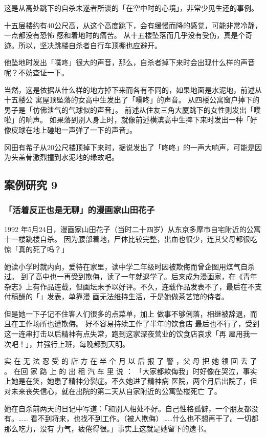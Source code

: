 \documentclass[UTF8]{ctexart}
\begin{document}
这是从高处跳下的自杀未遂者所谈的「在空中时的心境」，非常少见生还的事例。

十五层楼约有$40$公尺高，从这个高度跳下，会有缓慢而降的感觉，可能非常冷静，一点都没有恐怖
感和着地时的痛苦。
从十五楼坠落而几乎没有受伤，真是个奇迹。所以，坚决跳楼自杀者自行车顶棚也应避开。

他坠地时发出「噗咚」很大的声音，那么，自杀者掉下来时会出现什么样的声音呢？不妨查证一下。

当然，这是依据从什么样的地方掉下来而各有不同的，如果地面是水泥地，前述从十五楼公
寓屋顶坠落的女高中生发出了「噗咚」的声音。
从四楼公寓窗户掉下的男子是「仿佛泄气的气球似的声音」。
前述从住友三角大厦跳下的女性则发出「噗啦」的响声。
如果落到别人身上时，就像前述横滨高中生摔下来时发出一种「好像皮球在地上碰地一声弹了一下的声音」。

冈田有希子从$20$公尺楼顶掉下来时，据说发出了「咚咚」的一声大响声，可能是因为头盖骨激烈撞到水泥地的缘故吧。

\subsection{案例研究 9}
\subsubsection*{「活着反正也是无聊」的漫画家山田花子}

1992 年5月24日，漫画家山田花子（当时二十四岁）从东京多摩市自宅附近的公寓十一楼跳楼自杀。
因为腰部着地，尸体比较完整，出血也很少，连其父母都很吃惊「真的死了吗？」

她读小学时就内向，爱待在家里，读中学二年级时因被欺侮而曾企图用煤气自杀过。
到了高中也一再受到欺侮，读了一年就退学了。后来成为漫画家，在《青年杂志》上有作品连载，但画坛未予以好评。不久，连载作品发表不了，最后在不支付稿酬的「\qquad \qquad 」发表，单靠漫 画无法维持生活，于是她做茶艺馆的侍者。

但是她一下子记不住客人们很多的点菜单，加上 做事不够俐落，相继被辞退，而且在工作场所也遭欺侮。
好不容易持续工作了半年的饮食店 最后也不行了，受到这一连串打击以后精神有点失常，跑到这家深夜营业的饮食店哀求「再 雇用我一次吧！」，并强行上班，每晚都到天明。

实 在 无 法 忍 受 的 店 方 在 半 个 月 以 后 报 了 警 ，父 母 把 她 领 回 去 了 。
在回 家 路 上 的 出 租 汽 车 里 说 ： 「大家都欺侮我」时好像在哭泣，事实上她是在笑，她患了精神分裂症。不久她进了精神病 医院，两个月后出院了，但对未来丧失信心，就在出院的第二天从自家附近的公寓坠楼死亡 了。

她在自杀前两天的日记中写道：「和别人相处不好。自己性格孤僻，一个朋友都没有。…… 看不到将来，也找不到工作。（被人欺侮）……什么也不想再干了。一切都那么吃力，没有 力气，疲倦得很。」事实上这就是她留下的遗书。
\end{document}
